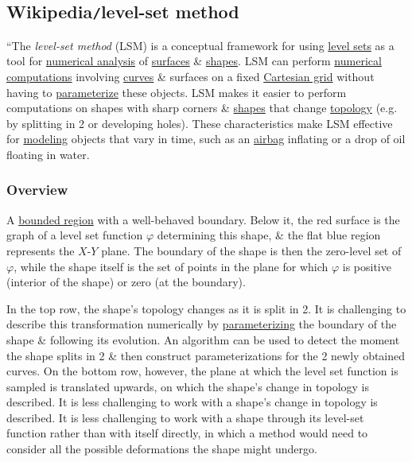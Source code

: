 \documentclass{article}
\begin{document}
\subsection{Wikipedia{\tt/}level-set method}
``The {\it level-set method} (LSM) is a conceptual framework for using \href{https://en.wikipedia.org/wiki/Level_set}{level sets} as a tool for \href{https://en.wikipedia.org/wiki/Numerical_analysis}{numerical analysis} of \href{https://en.wikipedia.org/wiki/Surface_(topology)}{surfaces} \& \href{https://en.wikipedia.org/wiki/Shape}{shapes}. LSM can perform \href{https://en.wikipedia.org/wiki/Numerical_computation}{numerical computations} involving \href{https://en.wikipedia.org/wiki/Curve}{curves} \& surfaces on a fixed \href{https://en.wikipedia.org/wiki/Cartesian_grid}{Cartesian grid} without having to \href{https://en.wikipedia.org/wiki/Parametric_surface}{parameterize} these objects. LSM makes it easier to perform computations on shapes with sharp corners \& \href{https://en.wikipedia.org/wiki/Shape}{shapes} that change \href{https://en.wikipedia.org/wiki/Topology}{topology} (e.g. by splitting in 2 or developing holes). These characteristics make LSM effective for \href{https://en.wikipedia.org/wiki/Modeling}{modeling} objects that vary in time, such as an \href{https://en.wikipedia.org/wiki/Airbag}{airbag} inflating or a drop of oil floating in water.

\subsubsection{Overview}
A \href{https://en.wikipedia.org/wiki/Bounded_region}{bounded region} with a well-behaved boundary. Below it, the red surface is the graph of a level set function $\varphi$ determining this shape, \& the flat blue region represents the $X$-$Y$ plane. The boundary of the shape is then the zero-level set of $\varphi$, while the shape itself is the set of points in the plane for which $\varphi$ is positive (interior of the shape) or zero (at the boundary).

In the top row, the shape's topology changes as it is split in 2. It is challenging to describe this transformation numerically by \href{https://en.wikipedia.org/wiki/Parametrization_(geometry)}{parameterizing} the boundary of the shape \& following its evolution. An algorithm can be used to detect the moment the shape splits in 2 \& then construct parameterizations for the 2 newly obtained curves. On the bottom row, however, the plane at which the level set function is sampled is translated upwards, on which the shape's change in topology is described. It is less challenging to work with a shape's change in topology is described. It is less challenging to work with a shape through its level-set function rather than with itself directly, in which a method would need to consider all the possible deformations the shape might undergo.
\end{document}
